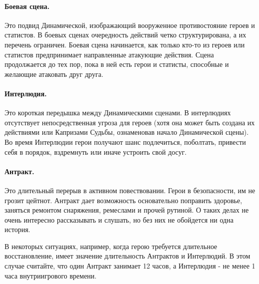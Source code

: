 \paragraph{Боевая сцена.} Это подвид Динамической, изображающий вооруженное противостояние героев и статистов. В боевых сценах очередность действий четко структурирована, а их перечень ограничен. Боевая сцена начинается, как только кто-то из героев или статистов предпринимает направленные атакующие действия. Сцена продолжается до тех пор, пока в ней есть герои и статисты, способные и желающие атаковать друг друга.
\paragraph{Интерлюдия.} Это короткая передышка между Динамическими сценами. В интерлюдиях отсутствует непосредственная угроза для героев (хотя она может быть создана их действиями или Капризами Судьбы, ознаменовав начало Динамической сцены). Во время Интерлюдии герои получают шанс подлечиться, поболтать, привести себя в порядок, вздремнуть или иначе устроить свой досуг. 
\paragraph{Антракт.} Это 
длительный перерыв в активном повествовании. Герои в безопасности, им не грозит цейтнот. Антракт дает возможность основательно поправить здоровье, заняться ремонтом снаряжения, ремеслами и прочей рутиной. О таких делах не очень интересно рассказывать и слушать, но без них не обойдется ни одна история.

\begin{tcolorbox}
В некоторых ситуациях, например, когда герою требуется длительное восстановление, имеет значение длительность Антрактов и Интерлюдий. В этом случае считайте, что один Антракт занимает 12 часов, а Интерлюдия - не менее 1 часа внутриигрового времени. 
\end{tcolorbox}

